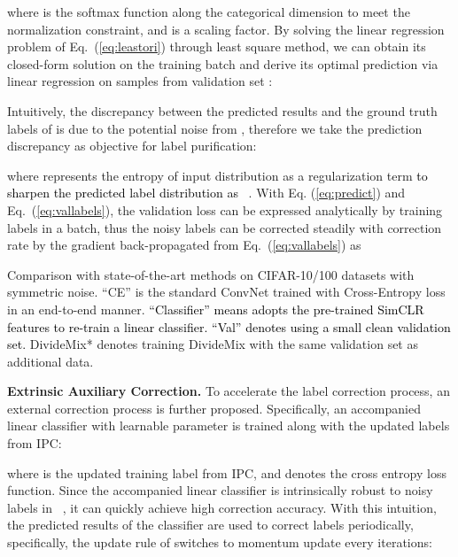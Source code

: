 \documentclass[10pt,twocolumn,letterpaper]{article}
\newcommand{\typ}[1]{\textcolor{black}{#1}}
\newcommand{\zbs}[1]{\textcolor{black}{#1}}
\newcommand{\red}[1]{{#1}}
\begin{document}
where  is the softmax function along the categorical dimension to meet the normalization constraint, and  is a scaling factor. By {solving the linear regression problem of} Eq.~(\ref{eq:leastori}) through least square method, we can obtain its closed-form solution  on the training {batch}  {and derive its optimal prediction via linear regression on samples } from validation set :

Intuitively, the discrepancy between the predicted results  and the ground truth labels  of  is due to the potential noise from , therefore we take the prediction discrepancy as objective for label purification:

{where  represents the entropy of input distribution as a regularization term \typ{to sharpen the predicted label distribution as ~\cite{yi2019probabilistic}}.} { With Eq. (\ref{eq:predict}) and Eq.~(\ref{eq:vallabels}), the validation loss can be expressed analytically by training labels  in a batch, thus} the noisy labels can be corrected steadily {with correction rate  by} the gradient back-propagated {from} Eq.~(\ref{eq:vallabels}) as


\begin{table*}[!t]
\small
    \centering
    \caption{
        Comparison with state-of-the-art methods  on CIFAR-10/100 datasets with symmetric noise. 
``CE'' is the standard ConvNet trained with Cross-Entropy loss in an end-to-end manner. \zbs{``Classifier'' means adopts the pre-trained SimCLR features to re-train a linear classifier. \red{``Val'' denotes using a small clean validation set.}}  DivideMix* denotes training DivideMix with the same validation set as additional data.}
    \vspace{-1em}
    
    \setlength\tabcolsep{10pt}
    \resizebox{0.9\textwidth}{!}{+}
    \label{tab:cifar_sym}
\end{table*}



\textbf{Extrinsic Auxiliary Correction.} To accelerate the label correction process, {an external correction process} is {further} proposed. Specifically, an {accompanied linear} classifier  with learnable parameter  is trained {along} with the updated labels from IPC:

where  is the updated training label from IPC, {and  denotes the cross entropy loss function.}
Since the {accompanied linear} classifier is intrinsically robust to noisy labels {in }~\cite{Reed2015Training}, it can quickly achieve high correction accuracy. {With this intuition}, the predicted results of the classifier  are used {to correct labels periodically}, specifically, the update rule of  switches to momentum update every  iterations:
\end{document}
